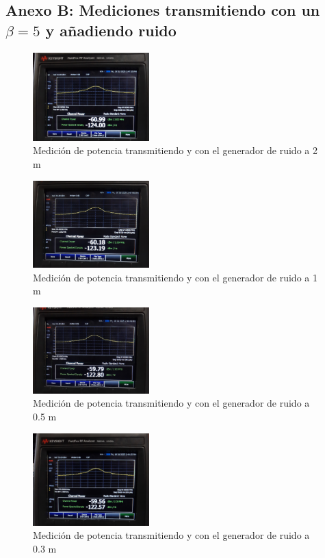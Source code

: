 \documentclass[conference]{IEEEtran}
\begin{document}
	\newpage
	
	\subsection{Anexo B: Mediciones transmitiendo con un $\beta =5$ y añadiendo ruido}
	
	\begin{figure}[h]
		\centering
		\includegraphics[width=0.4\textwidth]{media/M-S5+R2.jpg}
		\caption{Medición de potencia transmitiendo y con el generador de ruido a 2 m}
		\label{fig:M-S5+R2}
	\end{figure}
	
	\begin{figure}[h]
		\centering
		\includegraphics[width=0.4\textwidth]{media/M-S5+R1.jpg}
		\caption{Medición de potencia transmitiendo y con el generador de ruido a 1 m}
		\label{fig:M-S5+R1}
	\end{figure}
	
	\begin{figure}[h]
		\centering
		\includegraphics[width=0.4\textwidth]{media/M-S5+R0.5.jpg}
		\caption{Medición de potencia transmitiendo y con el generador de ruido a 0.5 m}
		\label{fig:M-S5+R.5}
	\end{figure}
	
	\begin{figure}[h]
		\centering
		\includegraphics[width=0.4\textwidth]{media/M-S5+R0.3.jpg}
		\caption{Medición de potencia transmitiendo y con el generador de ruido a 0.3 m}
		\label{fig:M-S5+R0.3}
	\end{figure}
	
\end{document}
